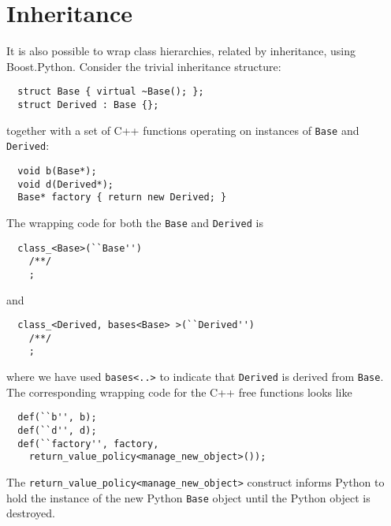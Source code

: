 \section{Inheritance}
It is also possible to wrap class hierarchies, related by inheritance, using Boost.Python. Consider the trivial inheritance structure:
\begin{verbatim}
  struct Base { virtual ~Base(); };
  struct Derived : Base {};
\end{verbatim}
together with a set of C++ functions operating on instances of \verb|Base| and \verb|Derived|:
\begin{verbatim}
  void b(Base*);
  void d(Derived*);
  Base* factory { return new Derived; }
\end{verbatim}
The wrapping code for both the \verb|Base| and \verb|Derived| is
\begin{verbatim}
  class_<Base>(``Base'')
    /**/
    ;
\end{verbatim}
and
\begin{verbatim}
  class_<Derived, bases<Base> >(``Derived'')
    /**/
    ;
\end{verbatim}
where we have used \verb|bases<..>| to indicate that \verb|Derived| is derived from \verb|Base|. The corresponding wrapping code for the C++ free functions looks like
\begin{verbatim}
  def(``b'', b);
  def(``d'', d);
  def(``factory'', factory, 
    return_value_policy<manage_new_object>());
\end{verbatim}
The \verb|return_value_policy<manage_new_object>| construct informs Python to hold the instance of the new Python \verb|Base| object until the Python object is destroyed.

